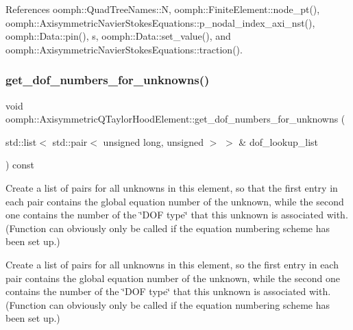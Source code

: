 References oomph\+::\+Quad\+Tree\+Names\+::N, oomph\+::\+Finite\+Element\+::node\+\_\+pt(), oomph\+::\+Axisymmetric\+Navier\+Stokes\+Equations\+::p\+\_\+nodal\+\_\+index\+\_\+axi\+\_\+nst(), oomph\+::\+Data\+::pin(), s, oomph\+::\+Data\+::set\+\_\+value(), and oomph\+::\+Axisymmetric\+Navier\+Stokes\+Equations\+::traction().

\mbox{\label{classoomph_1_1AxisymmetricQTaylorHoodElement_ad763c91177814d4221ec485b076a38e9}} 
\subsubsection{\texorpdfstring{get\+\_\+dof\+\_\+numbers\+\_\+for\+\_\+unknowns()}{get\_dof\_numbers\_for\_unknowns()}}
{\footnotesize\ttfamily void oomph\+::\+Axisymmetric\+Q\+Taylor\+Hood\+Element\+::get\+\_\+dof\+\_\+numbers\+\_\+for\+\_\+unknowns (\begin{DoxyParamCaption}\item[{std\+::list$<$ std\+::pair$<$ unsigned long, unsigned $>$ $>$ \&}]{dof\+\_\+lookup\+\_\+list }\end{DoxyParamCaption}) const\hspace{0.3cm}{\ttfamily [virtual]}}



Create a list of pairs for all unknowns in this element, so that the first entry in each pair contains the global equation number of the unknown, while the second one contains the number of the \char`\"{}\+D\+O\+F type\char`\"{} that this unknown is associated with. (Function can obviously only be called if the equation numbering scheme has been set up.) 

Create a list of pairs for all unknowns in this element, so the first entry in each pair contains the global equation number of the unknown, while the second one contains the number of the \char`\"{}\+D\+O\+F type\char`\"{} that this unknown is associated with. (Function can obviously only be called if the equation numbering scheme has been set up.) 

